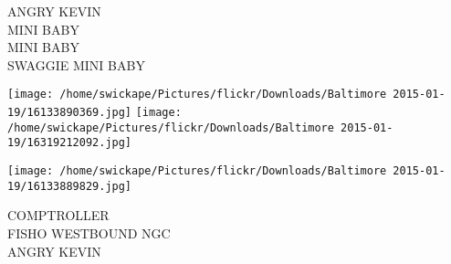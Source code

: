 \documentclass[10pt,letterpaper]{article}
\begin{document}
ANGRY KEVIN\\
MINI BABY\\
MINI BABY\\
SWAGGIE MINI BABY
\pagebreak

\texttt{[image: /home/swickape/Pictures/flickr/Downloads/Baltimore 2015-01-19/16133890369.jpg]}
\texttt{[image: /home/swickape/Pictures/flickr/Downloads/Baltimore 2015-01-19/16319212092.jpg]}

\texttt{[image: /home/swickape/Pictures/flickr/Downloads/Baltimore 2015-01-19/16133889829.jpg]}

COMPTROLLER\\
FISHO WESTBOUND NGC\\
ANGRY KEVIN
\pagebreak
\end{document}
